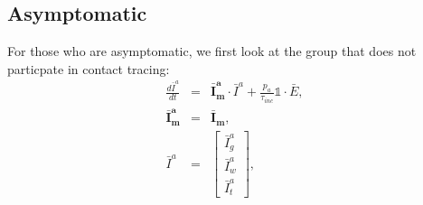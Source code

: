 \documentclass[notitlepage, superscriptaddress]{revtex4-2}
\begin{document}
\subsection{Asymptomatic}
For those who are asymptomatic, we first look at the group that does not particpate in contact tracing:
\begin{eqnarray}
\frac{d\bar{I}^{a}}{dt} &=& \boldsymbol{\bar{I}^{a}_{m}} \cdot \bar{I}^{a} + \frac{p_{a}}{\tau_{inc}} \mathbb{1} \cdot  \bar{E}, \\ 
\boldsymbol{\bar{I}^{a}_{m}} &=& \boldsymbol{\bar{I}_{m}}, \\ 
%
\bar{I}^{a} &=& 
\begin{bmatrix}
\bar{I}^{a}_{g} \\ \bar{I}^{a}_{w}\\ \bar{I}^{a}_{t}
\end{bmatrix},
\end{eqnarray}
\end{document}
